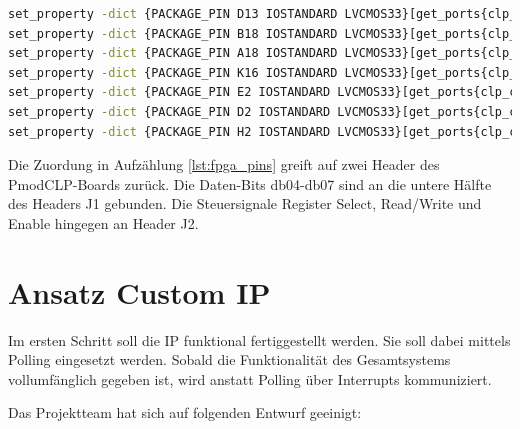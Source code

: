 \begin{lstlisting}[language=bash,caption={Pin-Zuordnung im Constraints-File},breaklines=true,captionpos=b,basicstyle=\footnotesize\ttfamily,
    label={lst:fpga_pins}]
set_property -dict {PACKAGE_PIN D13 IOSTANDARD LVCMOS33}[get_ports{clp_db_tri_io[4]}];#db04
set_property -dict {PACKAGE_PIN B18 IOSTANDARD LVCMOS33}[get_ports{clp_db_tri_io[5]}];#db05
set_property -dict {PACKAGE_PIN A18 IOSTANDARD LVCMOS33}[get_ports{clp_db_tri_io[6]}];#db06
set_property -dict {PACKAGE_PIN K16 IOSTANDARD LVCMOS33}[get_ports{clp_db_tri_io[7]}];#db07
set_property -dict {PACKAGE_PIN E2 IOSTANDARD LVCMOS33}[get_ports{clp_cb_tri_o[0]}];  #lcd_rs
set_property -dict {PACKAGE_PIN D2 IOSTANDARD LVCMOS33}[get_ports{clp_cb_tri_o[1]}];  #lcd_rw
set_property -dict {PACKAGE_PIN H2 IOSTANDARD LVCMOS33}[get_ports{clp_cb_tri_o[2]}];  #lcd_e
\end{lstlisting}

Die Zuordung in Aufzählung \ref{lst:fpga_pins} greift auf zwei Header des PmodCLP-Boards zurück. Die Daten-Bits db04-db07 sind an die untere Hälfte des Headers J1 gebunden. Die Steuersignale Register Select, Read/Write und Enable hingegen an Header J2.

\section{Ansatz Custom IP}

Im ersten Schritt soll die IP funktional fertiggestellt werden. Sie soll dabei mittels Polling eingesetzt werden. Sobald die Funktionalität des Gesamtsystems vollumfänglich gegeben ist, wird anstatt Polling über Interrupts kommuniziert.\newline

Das Projektteam hat sich auf folgenden Entwurf geeinigt:

